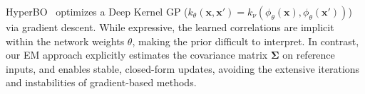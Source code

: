\documentclass{article}
\newcommand{\bX}{\mathbf{X}}
\newcommand{\sample}{f}
\begin{document}

HyperBO~\citep{wang2024hyperbo} optimizes a Deep Kernel GP ($k_{\theta}(\mathbf{x}, \mathbf{x}') = k_{\nu}(\phi_\theta(\mathbf{x}), \phi_\theta(\mathbf{x}'))$) via gradient descent.
While expressive, the learned correlations are implicit within the network weights $\theta$, making the prior difficult to interpret.
In contrast, our EM approach explicitly estimates the covariance matrix $\boldsymbol{\Sigma}$ on reference inputs,
and enables stable, closed-form updates, avoiding the extensive iterations and instabilities of gradient-based methods.


\end{document}
